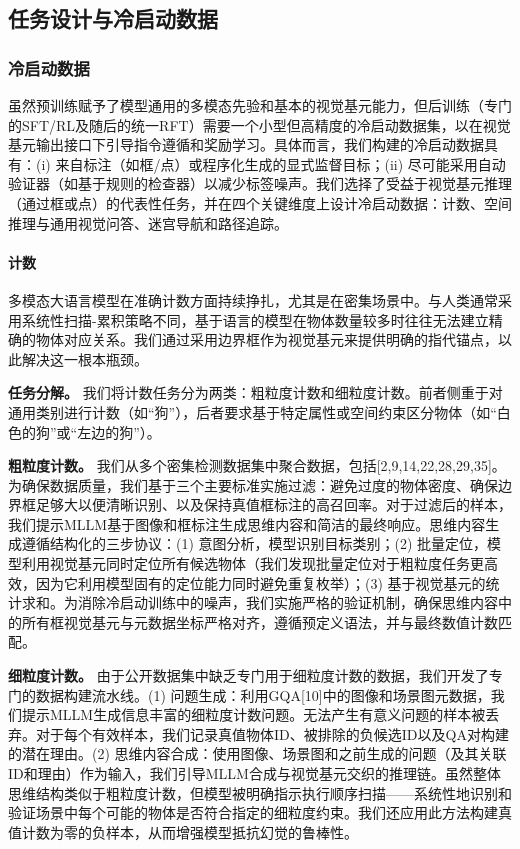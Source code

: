 \documentclass[11pt,a4paper]{article}
\begin{document}
\subsection{任务设计与冷启动数据}

\subsubsection{冷启动数据}

虽然预训练赋予了模型通用的多模态先验和基本的视觉基元能力，但后训练（专门的SFT/RL及随后的统一RFT）需要一个小型但高精度的冷启动数据集，以在视觉基元输出接口下引导指令遵循和奖励学习。具体而言，我们构建的冷启动数据具有：(i) 来自标注（如框/点）或程序化生成的显式监督目标；(ii) 尽可能采用自动验证器（如基于规则的检查器）以减少标签噪声。我们选择了受益于视觉基元推理（通过框或点）的代表性任务，并在四个关键维度上设计冷启动数据：计数、空间推理与通用视觉问答、迷宫导航和路径追踪。

\paragraph{计数}
多模态大语言模型在准确计数方面持续挣扎，尤其是在密集场景中。与人类通常采用系统性扫描-累积策略不同，基于语言的模型在物体数量较多时往往无法建立精确的物体对应关系。我们通过采用边界框作为视觉基元来提供明确的指代锚点，以此解决这一根本瓶颈。

\textbf{任务分解。} 我们将计数任务分为两类：粗粒度计数和细粒度计数。前者侧重于对通用类别进行计数（如“狗”），后者要求基于特定属性或空间约束区分物体（如“白色的狗”或“左边的狗”）。

\textbf{粗粒度计数。} 我们从多个密集检测数据集中聚合数据，包括[2,9,14,22,28,29,35]。为确保数据质量，我们基于三个主要标准实施过滤：避免过度的物体密度、确保边界框足够大以便清晰识别、以及保持真值框标注的高召回率。对于过滤后的样本，我们提示MLLM基于图像和框标注生成思维内容和简洁的最终响应。思维内容生成遵循结构化的三步协议：(1) 意图分析，模型识别目标类别；(2) 批量定位，模型利用视觉基元同时定位所有候选物体（我们发现批量定位对于粗粒度任务更高效，因为它利用模型固有的定位能力同时避免重复枚举）；(3) 基于视觉基元的统计求和。为消除冷启动训练中的噪声，我们实施严格的验证机制，确保思维内容中的所有框视觉基元与元数据坐标严格对齐，遵循预定义语法，并与最终数值计数匹配。

\textbf{细粒度计数。} 由于公开数据集中缺乏专门用于细粒度计数的数据，我们开发了专门的数据构建流水线。(1) 问题生成：利用GQA[10]中的图像和场景图元数据，我们提示MLLM生成信息丰富的细粒度计数问题。无法产生有意义问题的样本被丢弃。对于每个有效样本，我们记录真值物体ID、被排除的负候选ID以及QA对构建的潜在理由。(2) 思维内容合成：使用图像、场景图和之前生成的问题（及其关联ID和理由）作为输入，我们引导MLLM合成与视觉基元交织的推理链。虽然整体思维结构类似于粗粒度计数，但模型被明确指示执行顺序扫描——系统性地识别和验证场景中每个可能的物体是否符合指定的细粒度约束。我们还应用此方法构建真值计数为零的负样本，从而增强模型抵抗幻觉的鲁棒性。
\end{document}

